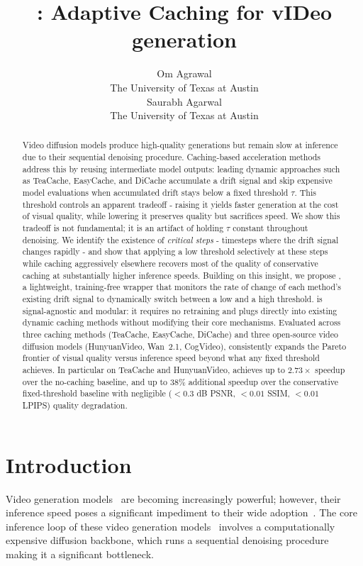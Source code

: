 \documentclass{article}
\title{\system: Adaptive Caching for vIDeo generation}
\author{%
  Om Agrawal \\
  The University of Texas at Austin \\
  \And
  Saurabh Agarwal \\
  The University of Texas at Austin \\
}
\begin{document}
\maketitle

\begin{abstract}

Video diffusion models produce high-quality generations but remain slow at inference due to their sequential denoising procedure. Caching-based acceleration methods address this by reusing intermediate model outputs: leading dynamic approaches such as TeaCache, EasyCache, and DiCache accumulate a drift signal and skip expensive model evaluations when accumulated drift stays below a fixed threshold $\tau$. This threshold controls an apparent tradeoff - raising it yields faster generation at the cost of visual quality, while lowering it preserves quality but sacrifices speed. We show this tradeoff is not fundamental; it is an artifact of holding $\tau$ constant throughout denoising. We identify the existence of \emph{critical steps} - timesteps where the drift signal changes rapidly - and show that applying a low threshold selectively at these steps while caching aggressively elsewhere recovers most of the quality of conservative caching at substantially higher inference speeds. Building on this insight, we propose \system, a lightweight, training-free wrapper that monitors the rate of change of each method's existing drift signal to dynamically switch between a low and a high threshold. \system is signal-agnostic and modular: it requires no retraining and plugs directly into existing dynamic caching methods without modifying their core mechanisms. Evaluated across three caching methods (TeaCache, EasyCache, DiCache) and three open-source video diffusion models (HunyuanVideo, Wan~2.1, CogVideo), \system consistently expands the Pareto frontier of visual quality versus inference speed beyond what any fixed threshold achieves. In particular on TeaCache and HunyuanVideo, \system achieves up to $2.73\times$ speedup over the no-caching baseline, and up to $38\%$ additional speedup over the conservative fixed-threshold baseline with negligible ($<0.3$ dB PSNR, $<0.01$ SSIM, $<0.01$ LPIPS) quality degradation.
\end{abstract}


\section{Introduction}

Video generation models~\cite{zheng2024opensora, ma2024latte, brooks2024sora, wang2025wan, hong2023cogvideo, kong2024hunyuanvideo} are becoming increasingly powerful; however, their inference speed poses a significant impediment to their wide adoption~\cite{li2024snapfusion}. The
core inference loop of these video generation models~\cite{zheng2024opensora, ma2024latte, brooks2024sora, wang2025wan, hong2023cogvideo, kong2024hunyuanvideo} involves a computationally expensive diffusion backbone, which runs a sequential denoising procedure~\cite{liu2025teacache, zhou2025easycache} making it a significant bottleneck.
\end{document}
